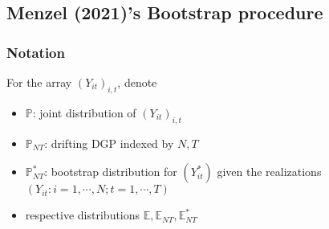 \documentclass[twoside]{article}
\begin{document}
\subsection{Menzel (2021)'s Bootstrap procedure}\label{subsec:menzel_bootstrap}
\subsubsection{Notation}
For the array $\left(Y_{it}\right)_{i,t}$, denote 
\begin{itemize}
    \item $\mathbb{P}$: joint distribution of $\left(Y_{it}\right)_{i,t}$
    \item $\mathbb{P}_{NT}$: drifting DGP indexed by $N,T$
    \item $\mathbb{P}^*_{NT}$: bootstrap distribution for $\left(Y^*_{it}\right)$ given the realizations $\left(  Y_{it}:i=1,\cdots,N; t= 1,\cdots,T  \right)$
    \item respective distributions $\mathbb{E},\mathbb{E}_{NT},\mathbb{E}^*_{NT}$
\end{itemize}
\end{document}
